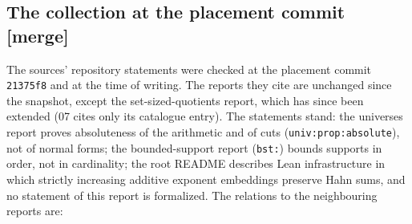 \documentclass[11pt,letterpaper]{article}
\numberwithin{equation}{section}
\theoremstyle{definition}
\theoremstyle{remark}
\newcommand{\mergetag}{\textup{\textsf{\small[merge]}}}%
\newcommand{\lbl}[1]{\nolinkurl{#1}}%
\begin{document}
\subsection{The collection at the placement commit \mergetag}
\label{lce:sub:collection}
The sources' repository statements were checked at the placement commit
\texttt{21375f8} and at the time of writing. The reports they cite are
unchanged since the snapshot, except the set-sized-quotients report, which
has since been extended (07 cites only its catalogue entry). The statements
stand:
the universes report proves absoluteness of the arithmetic and of cuts
(\lbl{univ:prop:absolute}), not of normal forms; the bounded-support report
(\lbl{bst:}) bounds supports in order, not in cardinality; the root README
describes Lean infrastructure in which strictly increasing additive exponent
embeddings preserve Hahn sums, and no statement of this report is
formalized. The relations to the neighbouring reports are:
\end{document}
